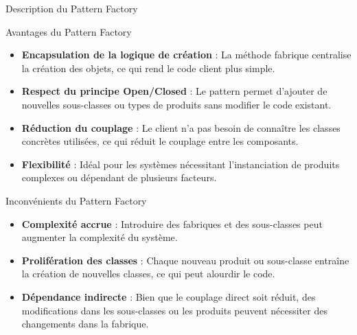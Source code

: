\documentclass[aspectratio=169]{beamer}
\begin{document}
  \begin{frame}{Description du Pattern Factory}
  \end{frame}

  \begin{frame}{Avantages du Pattern Factory}
    \begin{itemize}
        \item \textbf{Encapsulation de la logique de création} : La méthode fabrique centralise la création des objets, ce qui rend le code client plus simple.
        \item \textbf{Respect du principe Open/Closed} : Le pattern permet d'ajouter de nouvelles sous-classes ou types de produits sans modifier le code existant.
        \item \textbf{Réduction du couplage} : Le client n'a pas besoin de connaître les classes concrètes utilisées, ce qui réduit le couplage entre les composants.
        \item \textbf{Flexibilité} : Idéal pour les systèmes nécessitant l'instanciation de produits complexes ou dépendant de plusieurs facteurs.
    \end{itemize}
  \end{frame}

  \begin{frame}{Inconvénients du Pattern Factory}
    \begin{itemize}
        \item \textbf{Complexité accrue} : Introduire des fabriques et des sous-classes peut augmenter la complexité du système.
        \item \textbf{Prolifération des classes} : Chaque nouveau produit ou sous-classe entraîne la création de nouvelles classes, ce qui peut alourdir le code.
        \item \textbf{Dépendance indirecte} : Bien que le couplage direct soit réduit, des modifications dans les sous-classes ou les produits peuvent nécessiter des changements dans la fabrique.
    \end{itemize}
  \end{frame}
\end{document}

